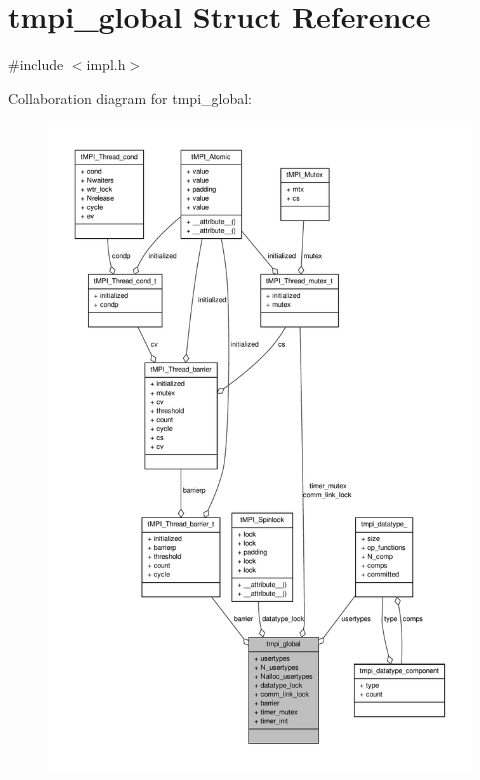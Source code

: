 \hypertarget{structtmpi__global}{\section{tmpi\-\_\-global \-Struct \-Reference}
\label{structtmpi__global}
}


{\ttfamily \#include $<$impl.\-h$>$}



\-Collaboration diagram for tmpi\-\_\-global\-:
\nopagebreak
\begin{figure}[H]
\begin{center}
\leavevmode
\includegraphics[width=350pt]{structtmpi__global__coll__graph}
\end{center}
\end{figure}
